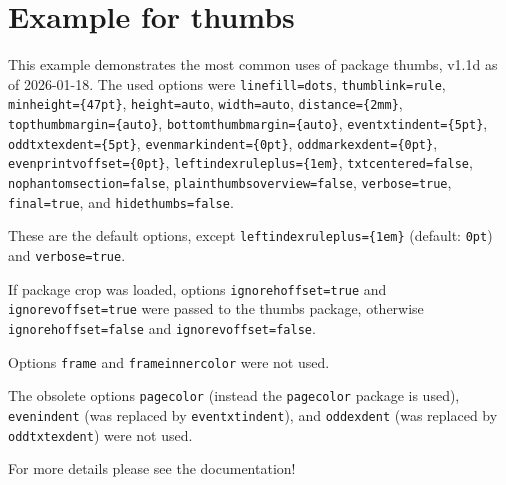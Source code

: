 \documentclass[a4paper,twoside,british]{article}[2025/01/22]%
\begin{document}
\label{FirstPage}
\section*{Example for thumbs}

This example demonstrates the most common uses of package \textsf{thumbs}, v1.1d as of 2026-01-18.
The used options were\newline
\texttt{linefill=dots}, \texttt{thumblink=rule}, \texttt{minheight=\{47pt\}},
\texttt{height=auto}, \texttt{width={auto}}, \newline
\texttt{distance=\{2mm\}}, \texttt{topthumbmargin=\{auto\}}, \texttt{bottomthumbmargin=\{auto\}}, \newline
\texttt{eventxtindent=\{5pt\}}, \texttt{oddtxtexdent=\{5pt\}},
\texttt{evenmarkindent=\{0pt\}}, \texttt{oddmarkexdent=\{0pt\}}, \newline
\texttt{evenprintvoffset=\{0pt\}},
\texttt{leftindexruleplus=\{1em\}},
\texttt{txtcentered=false}, \newline
\texttt{nophantomsection=false},
\texttt{plainthumbsoverview=false},
\texttt{verbose=true}, \texttt{final=true}, and \newline
\texttt{hidethumbs=false}. \newline

These are the default options, except
\texttt{leftindexruleplus=\{1em\}} (default: \texttt{0pt}) and  \newline
\texttt{verbose=true}.\newline

If package \textsf{crop} was loaded, options
\texttt{ignorehoffset=true} and \texttt{ignorevoffset=true} were passed to the \textsf{thumbs} package,
otherwise \texttt{ignorehoffset=false} and \texttt{ignorevoffset=false}. \newline

Options \texttt{frame} and \texttt{frameinnercolor} were not used.\newline

The obsolete options \texttt{pagecolor} (instead the \texttt{pagecolor} package is used),
\texttt{evenindent} (was replaced by \texttt{eventxtindent}), and
\texttt{oddexdent} (was replaced by \texttt{oddtxtexdent}) were not used. \newline

For more details please see the documentation!\bigskip
\end{document}
